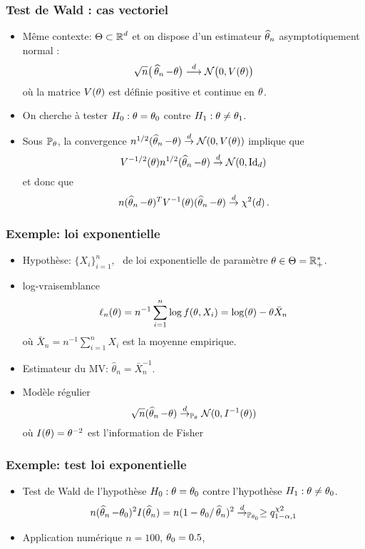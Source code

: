 \begin{frame}
\frametitle{Test de Wald : cas vectoriel}
\begin{itemize}
\item \alert{ Même contexte:} $\Theta \subset \operatorname{{\mathbb R}}^d$ et \alert{on dispose} d'un estimateur $\operatorname{\widehat \theta_{\mathnormal{n}}}$ asymptotiquement normal :
$$\sqrt{n}\big(\operatorname{\widehat \theta_{\mathnormal{n}}}-\theta\big)\stackrel{d}{\longrightarrow} {\mathcal N}\big(0, V(\theta)\big)$$
où la matrice $V(\theta)$ est \alert{définie positive} et continue en $\theta$.
\item On cherche à tester $H_0: \theta= \theta_0$ contre $H_1: \theta \ne \theta_1$.
\item Sous $\operatorname{{\mathbb P}}_\theta$, la convergence $n^{1/2} (\operatorname{\widehat \theta_{\mathnormal{n}}} - \theta) \stackrel{d}{\rightarrow} \mathcal{N}(0,V(\theta))$ implique que
$$
V^{-1/2}(\theta) n^{1/2} (\operatorname{\widehat \theta_{\mathnormal{n}}} - \theta) \stackrel{d}{\rightarrow} \mathcal{N}(0,\mathrm{Id}_{d})
$$
et donc que
$$
n (\operatorname{\widehat \theta_{\mathnormal{n}}} - \theta)^{T} V^{-1}(\theta) (\operatorname{\widehat \theta_{\mathnormal{n}}} - \theta) \stackrel{d}{\rightarrow} \chi^2(d)  \,.
$$
\end{itemize}
\end{frame}

\begin{frame}
\frametitle{Exemple: loi exponentielle}
\begin{itemize}
\item \alert{Hypothèse}: $\{X_i\}_{i=1}^n$, \iid\ de loi exponentielle de paramètre $\theta \in \Theta= \mathbb{R}_+^*$.
\item \alert{log-vraisemblance}
\[
\ell_n(\theta)= n^{-1} \sum_{i=1}^n \log f(\theta,X_i)= \log(\theta) - \theta \bar{X}_n
\]
où $\bar{X}_n= n^{-1} \sum_{i=1}^n X_i$ est la moyenne empirique.
\item Estimateur du MV: $\hat{\theta}_n = \bar{X}_n^{-1}$.
\item \alert{Modèle régulier}
\[
\sqrt{n} (\operatorname{\widehat \theta_{\mathnormal{n}}} - \theta) \stackrel{d}{\rightarrow}_{\operatorname{{\mathbb P}}_{\theta}} \mathcal{N}(0,I^{-1}(\theta))
\]
où $I(\theta)= \theta^{-2}$ est l'\alert{information de Fisher}
\end{itemize}
\end{frame}

\begin{frame}
\frametitle{Exemple: test loi exponentielle}
\begin{itemize}
\item \alert{Test de Wald} de l'hypothèse $H_0: \theta = \theta_0$ contre l'hypothèse $H_1: \theta \ne \theta_0$.
\begin{align*}
n (\operatorname{\widehat \theta_{\mathnormal{n}}} - \theta_0)^2 I(\operatorname{\widehat \theta_{\mathnormal{n}}})= n (1 - \theta_0 / \operatorname{\widehat \theta_{\mathnormal{n}}})^2 \stackrel{d}{\rightarrow}_{\operatorname{{\mathbb P}}_{\theta_0}} \geq q^{\chi2}_{1-\alpha,1}
\end{align*}
\item \alert{Application numérique} $n=100$, $\theta_0=0.5$,
\end{itemize}
\end{frame}


